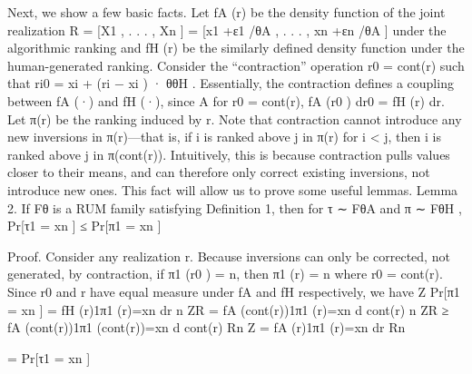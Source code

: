 \documentclass[10pt]{article}
\begin{document}
\begin{ReviewVerbatim}
Next, we show a few basic facts. Let fA (r) be the density function of the joint realization R =
[X1 , . . . , Xn ] = [x1 +ε1 /θA , . . . , xn +εn /θA ] under the algorithmic ranking and fH (r) be the similarly defined
density function under the human-generated ranking. Consider the “contraction” operation r0 = cont(r) such
that ri0 = xi + (ri − xi ) · θθH
. Essentially, the contraction defines a coupling between fA (·) and fH (·), since
A
for r0 = cont(r), fA (r0 ) dr0 = fH (r) dr. Let π(r) be the ranking induced by r. Note that contraction cannot
introduce any new inversions in π(r)—that is, if i is ranked above j in π(r) for i < j, then i is ranked above
j in π(cont(r)). Intuitively, this is because contraction pulls values closer to their means, and can therefore
only correct existing inversions, not introduce new ones. This fact will allow us to prove some useful lemmas.
Lemma 2. If Fθ is a RUM family satisfying Definition 1, then for τ ∼ FθA and π ∼ FθH ,
Pr[τ1 = xn ] ≤ Pr[π1 = xn ]

Proof. Consider any realization r. Because inversions can only be corrected, not generated, by contraction,
if π1 (r0 ) = n, then π1 (r) = n where r0 = cont(r). Since r0 and r have equal measure under fA and fH
respectively, we have
Z
Pr[π1 = xn ] =
fH (r)1π1 (r)=xn dr
n
ZR
=
fA (cont(r))1π1 (r)=xn d cont(r)
n
ZR
≥
fA (cont(r))1π1 (cont(r))=xn d cont(r)
Rn
Z
=
fA (r)1π1 (r)=xn dr
Rn

= Pr[τ1 = xn ]
\end{ReviewVerbatim}
\end{document}
